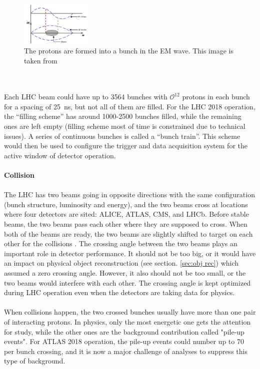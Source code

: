 \begin{figure}[!h]                
	\includegraphics[width=0.3\textwidth]{Chapter2/bunch.png}
	\centering
	\begin{center}
		\caption{The protons are formed into a bunch in the EM wave. This image is taken from \cite{Baird:1017689}}
		\label{Fig:bunch}            
	\end{center}
\end{figure}
\noindent
\\
\\Each LHC beam could have up to 3564 bunches with $\mathcal{O}^{12}$ protons in each bunch for a spacing of 25~ns, but not all of them are filled. For the LHC 2018 operation, the ``filling scheme''  has around 1000-2500 bunches filled, while the remaining ones are left empty (filling scheme most of time is constrained due to technical issues). A series of continuous bunches is called a ``bunch train''. This scheme would then be used to configure the trigger and data acquisition system for the active window of detector operation.
\\  
\\{\bf Collision}
\\
\\The LHC has two beams going in opposite directions with the same configuration (bunch structure, luminosity and energy), and the two beams cross at locations where four detectors are sited: ALICE\cite{alicetdr}, ATLAS\cite{atlastdr}, CMS\cite{cmstdr}, and LHCb\cite{lhcbtdr}. Before stable beams, the two beams pass each other where they are supposed to cross. When both of the beams are ready, the two beams are slightly shifted to target on each other for the collisions .  The crossing angle between the two beams plays an important role in detector performance. It should not be too big, or it would have an impact on physical object reconstruction (see section. \ref{sec:obj rec}) which assumed a zero crossing angle. However, it also should not be too small, or the two beams would interfere with each other. The crossing angle is kept optimized during LHC operation even when the detectors are taking data for physics.
\\
\\When collisions happen, the two crossed bunches usually have more than one pair of interacting protons. In physics, only the most energetic one gets the attention for study, while the other ones are the background contribution called "pile-up events". For ATLAS 2018 operation, the pile-up events could number up to 70 per bunch crossing, and it is now a major challenge of analyses to suppress this type of background.
